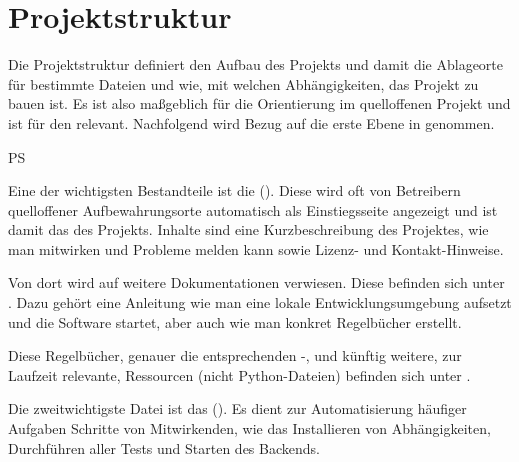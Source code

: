 \section{Projektstruktur}\label{sec:projektstruktur}

Die Projektstruktur definiert den Aufbau des Projekts und damit \zB die Ablageorte für bestimmte Dateien und wie, mit welchen Abhängigkeiten, das Projekt zu bauen ist.
Es ist also maßgeblich für die Orientierung im quelloffenen Projekt und ist für den  relevant.
Nachfolgend wird Bezug auf die erste Ebene in  genommen.

\begin{enumerateWithCode}[0em plus 1em]{PS}
    \item Eine der wichtigsten Bestandteile ist die  ().
    Diese wird oft von Betreibern quelloffener Aufbewahrungsorte automatisch als Einstiegsseite angezeigt und ist damit das  des Projekts.
    Inhalte sind \uA eine Kurzbeschreibung des Projektes, wie man mitwirken und Probleme melden kann sowie \ggf Lizenz- und Kontakt-Hinweise.

    \item Von dort wird auf weitere Dokumentationen verwiesen.
    Diese befinden sich unter .
    Dazu gehört \zB eine Anleitung wie man eine lokale Entwicklungsumgebung aufsetzt und die Software startet, aber auch wie man konkret Regelbücher erstellt.

    \item Diese Regelbücher, genauer die entsprechenden -, und \ggf künftig weitere, zur Laufzeit relevante, Ressourcen (nicht Python-Dateien) befinden sich unter .

    \item Die zweitwichtigste Datei ist das  ().
    Es dient zur Automatisierung häufiger Aufgaben \bzw Schritte von Mitwirkenden, wie \zB das Installieren von Abhängigkeiten, Durchführen aller Tests und Starten des Backends.
\end{enumerateWithCode}

